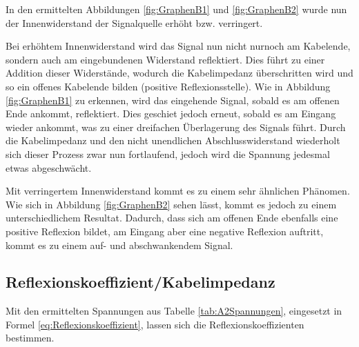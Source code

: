 \documentclass[12pt,a4paper,twoside]{article}
\begin{document}
\noindent
In den ermittelten Abbildungen \ref{fig:GraphenB1} und \ref{fig:GraphenB2} wurde nun der Innenwiderstand der Signalquelle erhöht bzw. verringert. \newline

\noindent
Bei erhöhtem Innenwiderstand wird das Signal nun nicht nurnoch am Kabelende, sondern auch am eingebundenen Widerstand reflektiert. 
Dies führt zu einer Addition dieser Widerstände, wodurch die Kabelimpedanz überschritten wird und so ein offenes Kabelende bilden (positive Reflexionsstelle).
Wie in Abbildung \ref{fig:GraphenB1} zu erkennen, wird das eingehende Signal, sobald es am offenen Ende ankommt, reflektiert.
Dies geschiet jedoch erneut, sobald es am Eingang wieder ankommt, was zu einer dreifachen Überlagerung des Signals führt.
Durch die Kabelimpedanz und den nicht unendlichen Abschlusswiderstand wiederholt sich dieser Prozess zwar nun fortlaufend, jedoch wird die Spannung jedesmal etwas abgeschwächt. \newline

\noindent
Mit verringertem Innenwiderstand kommt es zu einem sehr ähnlichen Phänomen.
Wie sich in Abbildung \ref{fig:GraphenB2} sehen lässt, kommt es jedoch zu einem unterschiedlichem Resultat.
Dadurch, dass sich am offenen Ende ebenfalls eine positive Reflexion bildet, am Eingang aber eine negative Reflexion auftritt, kommt es zu einem auf- und abschwankendem Signal.



\subsection{Reflexionskoeffizient/Kabelimpedanz}

Mit den ermittelten Spannungen aus Tabelle \ref{tab:A2Spannungen}, eingesetzt in Formel \ref{eq:Reflexionskoeffizient}, lassen sich die Reflexionskoeffizienten bestimmen.
\end{document}
